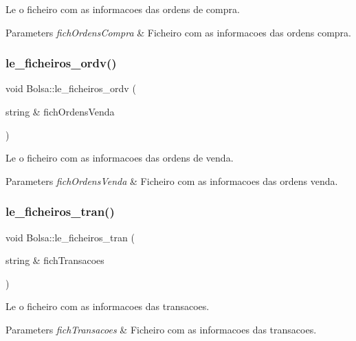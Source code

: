 Le o ficheiro com as informacoes das ordens de compra. 


\begin{DoxyParams}{Parameters}
{\em fich\+Ordens\+Compra} & Ficheiro com as informacoes das ordens compra. \\
\hline
\end{DoxyParams}
\hypertarget{class_bolsa_ab0cd2fab3d7490d5d4a431e5cb1106e6}{}\label{class_bolsa_ab0cd2fab3d7490d5d4a431e5cb1106e6} 
\subsubsection{\texorpdfstring{le\+\_\+ficheiros\+\_\+ordv()}{le\_ficheiros\_ordv()}}
{\footnotesize\ttfamily void Bolsa\+::le\+\_\+ficheiros\+\_\+ordv (\begin{DoxyParamCaption}\item[{string \&}]{fich\+Ordens\+Venda }\end{DoxyParamCaption})}



Le o ficheiro com as informacoes das ordens de venda. 


\begin{DoxyParams}{Parameters}
{\em fich\+Ordens\+Venda} & Ficheiro com as informacoes das ordens venda. \\
\hline
\end{DoxyParams}
\hypertarget{class_bolsa_ab099261f63bff9e274b94bca96cbd2f4}{}\label{class_bolsa_ab099261f63bff9e274b94bca96cbd2f4} 
\subsubsection{\texorpdfstring{le\+\_\+ficheiros\+\_\+tran()}{le\_ficheiros\_tran()}}
{\footnotesize\ttfamily void Bolsa\+::le\+\_\+ficheiros\+\_\+tran (\begin{DoxyParamCaption}\item[{string \&}]{fich\+Transacoes }\end{DoxyParamCaption})}



Le o ficheiro com as informacoes das transacoes. 


\begin{DoxyParams}{Parameters}
{\em fich\+Transacoes} & Ficheiro com as informacoes das transacoes. \\
\hline
\end{DoxyParams}
\hypertarget{class_bolsa_aba662f57e78213bee6de3db7c06c7293}{}\label{class_bolsa_aba662f57e78213bee6de3db7c06c7293} 
